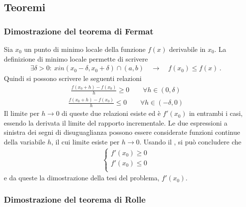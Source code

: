 \documentclass[letterpaper,10pt,italian]{jupyterBook}
\begin{document}
\subsection{Teoremi}
\label{\detokenize{ch/infinitesimal_calculus/derivatives-notes:teoremi}}\label{\detokenize{ch/infinitesimal_calculus/derivatives-notes:infinitesimal-calculus-derivatives-thm-notes}}\label{\detokenize{ch/infinitesimal_calculus/derivatives-notes:infinitesimal-calculus-derivatives-thm-fermat-notes}}\subsubsection*{Dimostrazione del teorema di Fermat}

\sphinxAtStartPar
Sia \(x_0\) un punto di minimo locale della funzione \(f(x)\) derivabile in \(x_0\). La definizione di minimo locale permette di scrivere
\begin{equation*}
\begin{split}\exists \delta > 0: \ x in (x_0 - \delta, x_0 + \delta) \cap (a,b) \quad \rightarrow \quad f(x_0) \le f(x) \ .\end{split}
\end{equation*}
\sphinxAtStartPar
Quindi si possono scrivere le seguenti relazioni
\begin{equation*}
\begin{split}\frac{f(x_0 + h) - f(x_0)}{h} \ge 0 \qquad \forall h \in (0, \delta)\end{split}
\end{equation*}\begin{equation*}
\begin{split}\frac{f(x_0 + h) - f(x_0)}{h} \le 0 \qquad \forall h \in (-\delta,0)\end{split}
\end{equation*}
\sphinxAtStartPar
Il limite per \(h \rightarrow 0\) di queste due relazioni esiste ed è \(f'(x_0)\) in entrambi i casi, essendo la derivata il limite del rapporto incrementale. Le due espressioni a sinistra dei segni di disuguaglianza possono essere considerate funzioni continue della variabile \(h\), il cui limite esiste per \(h \rightarrow 0\). Usando il {\hyperref[\detokenize{ch/infinitesimal_calculus/analysis:infinitesimal-calculus-continuous-fun-thms-sign}]{}}, si può concludere che
\begin{equation*}
\begin{split}\begin{cases}
  f'(x_0) \ge 0 \\
  f'(x_0) \le 0 \\
\end{cases}\end{split}
\end{equation*}
\sphinxAtStartPar
e da queste la dimostrazione della tesi del problema, \(f'(x_0)\).
\label{\detokenize{ch/infinitesimal_calculus/derivatives-notes:infinitesimal-calculus-derivatives-thm-rolle-notes}}\subsubsection*{Dimostrazione del teorema di Rolle}
\end{document}
